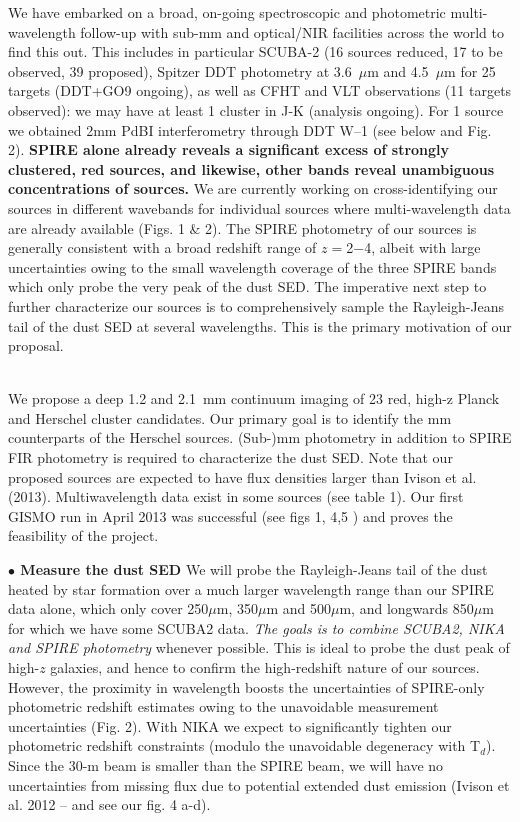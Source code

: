 \documentclass[11pt,a4]{article}
\begin{document}
We have embarked on a broad, on-going spectroscopic and photometric
multi-wavelength follow-up with sub-mm and optical/NIR facilities
across the world to find this out. This includes in particular SCUBA-2
(16 sources reduced, 17 to be observed, 39 proposed), Spitzer
DDT photometry at 3.6~$\mu$m and 4.5~$\mu$m for 25 targets (DDT+GO9
ongoing), as well as CFHT and VLT observations (11 targets observed):
we may have at least 1 cluster in J-K (analysis ongoing). For 1 source
we obtained 2mm PdBI interferometry through DDT W--1 (see below and
Fig. 2). {{\bf SPIRE alone already reveals a significant excess of
    strongly clustered, red sources, and likewise, other bands reveal
    unambiguous concentrations of sources.} We are currently working
  on cross-identifying our sources in different wavebands for
  individual sources where multi-wavelength data are already available
  (Figs. 1 \& 2). The SPIRE photometry of our sources is generally
  consistent with a broad redshift range of $z=$2$-$4, albeit with
  large uncertainties owing to the small wavelength coverage of the
  three SPIRE bands which only probe the very peak of the dust SED.}
The imperative next step to further characterize our sources is to
comprehensively sample the Rayleigh-Jeans tail of the dust SED at
several wavelengths. This is the primary motivation of our proposal.


\vspace{0.4cm}

\\
We propose a deep 1.2 and 2.1~mm continuum imaging of 23 red, high-z
Planck and Herschel cluster candidates. Our primary goal is to
identify the mm counterparts of the Herschel sources. (Sub-)mm
photometry in addition to SPIRE FIR photometry is required to
characterize the dust SED. Note that our proposed sources are expected
to have flux densities larger than Ivison et
al. (2013). Multiwavelength data exist in some sources (see table
1). Our first GISMO run in April 2013 was successful (see figs 1, 4,5
) and proves the feasibility of the project.

{\bf {$\bullet$} Measure the dust SED} We will probe the
Rayleigh-Jeans tail of the dust heated by star formation over a much
larger wavelength range than our SPIRE data alone, which only cover
250$\mu$m, 350$\mu$m and 500$\mu$m, and longwards 850$\mu$m for which
we have some SCUBA2 data. {\it The goals is to combine SCUBA2, NIKA
  and SPIRE photometry} whenever possible.  This is ideal to probe the
dust peak of high-$z$ galaxies, and hence to confirm the high-redshift
nature of our sources. However, the proximity in wavelength boosts the
uncertainties of SPIRE-only photometric redshift estimates owing to
the unavoidable measurement uncertainties (Fig. 2). With NIKA %
we expect to significantly tighten our photometric redshift
constraints (modulo the unavoidable degeneracy with T$_d$). Since the
30-m beam is smaller than the SPIRE beam, we will have no uncertainties
from missing flux due to potential extended dust emission (Ivison et
al. 2012 -- and see our fig. 4 a-d).
\end{document}
